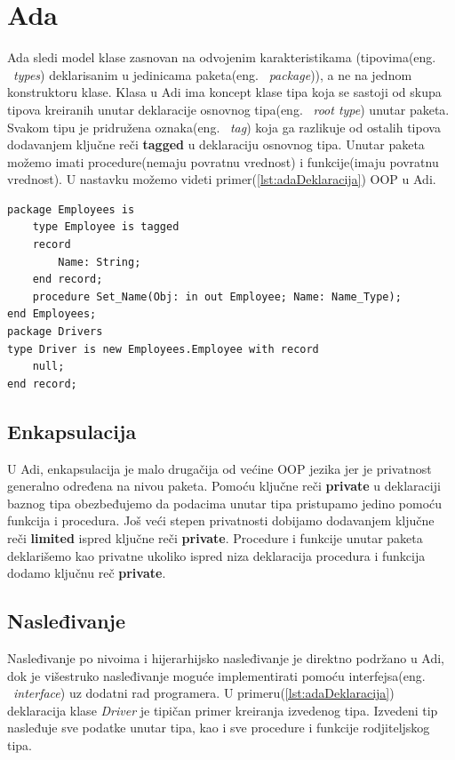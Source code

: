 \documentclass[a4paper]{article}
\begin{document}
\section{Ada}
\label{sec:ada}

Ada sledi model klase zasnovan na odvojenim karakteristikama (tipovima(eng. ~{\em types}) deklarisanim u jedinicama paketa(eng. ~{\em package})), a ne na jednom konstruktoru klase\cite{oopAda}. Klasa u Adi ima koncept klase tipa koja se sastoji od skupa tipova kreiranih unutar deklaracije osnovnog tipa(eng. ~{\em root type}) unutar paketa. Svakom tipu je pridružena oznaka(eng. ~{\em tag}) koja ga razlikuje od ostalih tipova dodavanjem ključne reči \textbf{tagged} u deklaraciju osnovnog tipa. Unutar paketa možemo imati procedure(nemaju povratnu vrednost) i funkcije(imaju povratnu vrednost). U nastavku možemo videti primer(\ref{lst:adaDeklaracija}) OOP u Adi.

\begin{lstlisting}[caption={Primer objektno orijentisanog programiranja u jeziku Ada.},frame=single, label=lst:adaDeklaracija]
package Employees is 
	type Employee is tagged 
	record
		Name: String;
	end record;
	procedure Set_Name(Obj: in out Employee; Name: Name_Type);
end Employees;
package Drivers
type Driver is new Employees.Employee with record
	null;
end record;
\end{lstlisting}

\subsection{Enkapsulacija}
\label{subsec:adaEnkapsulacija}
U Adi, enkapsulacija je malo drugačija od većine OOP jezika jer je privatnost generalno određena na nivou paketa\cite{adaIntroduction}. Pomoću ključne reči \textbf{private} u deklaraciji baznog tipa obezbeđujemo da podacima unutar tipa pristupamo jedino pomoću funkcija i procedura. Još veći stepen privatnosti dobijamo dodavanjem ključne reči \textbf{limited} ispred ključne reči \textbf{private}. Procedure i funkcije unutar paketa deklarišemo kao privatne ukoliko ispred niza deklaracija procedura i funkcija dodamo ključnu reč \textbf{private}.

\subsection{Nasleđivanje}
\label{subsec:adaNasledjivanje}
Nasleđivanje po nivoima i hijerarhijsko nasleđivanje je direktno podržano u Adi, dok je višestruko nasleđivanje moguće implementirati pomoću interfejsa(eng. ~{\em interface}) uz dodatni rad programera. U primeru(\ref{lst:adaDeklaracija}) deklaracija klase \textit{Driver} je tipičan primer kreiranja izvedenog tipa. Izvedeni tip nasleđuje sve podatke unutar tipa, kao i sve procedure i funkcije rodjiteljskog tipa.
\end{document}
